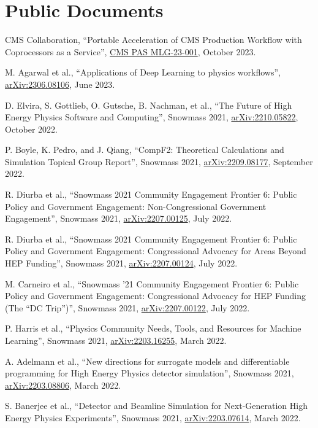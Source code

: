 \section{Public Documents}
\begin{description}[leftmargin=12pt,font=\normalfont,labelsep=0em]
\item CMS Collaboration, ``Portable Acceleration of CMS Production Workflow with Coprocessors as a Service'', \href{http://cds.cern.ch/record/2872973}{CMS PAS MLG-23-001}, October 2023.
\item M. Agarwal et al., ``Applications of Deep Learning to physics workflows'', \href{https://arxiv.org/abs/2306.08106}{arXiv:2306.08106}, June 2023.
\item D. Elvira, S. Gottlieb, O. Gutsche, B. Nachman, et al., ``The Future of High Energy Physics Software and Computing'', Snowmass 2021, \href{https://arxiv.org/abs/2210.05822}{arXiv:2210.05822}, October 2022.
\item P. Boyle, K. Pedro, and J. Qiang, ``CompF2: Theoretical Calculations and Simulation Topical Group Report'', Snowmass 2021, \href{https://arxiv.org/abs/2209.08177}{arXiv:2209.08177}, September 2022.
\item R. Diurba et al., ``Snowmass 2021 Community Engagement Frontier 6: Public Policy and Government Engagement: Non-Congressional Government Engagement'', Snowmass 2021, \href{https://arxiv.org/abs/2207.00125}{arXiv:2207.00125}, July 2022.
\item R. Diurba et al., ``Snowmass 2021 Community Engagement Frontier 6: Public Policy and Government Engagement: Congressional Advocacy for Areas Beyond HEP Funding'', Snowmass 2021, \href{https://arxiv.org/abs/2207.00124}{arXiv:2207.00124}, July 2022.
\item M. Carneiro et al., ``Snowmass '21 Community Engagement Frontier 6: Public Policy and Government Engagement: Congressional Advocacy for HEP Funding (The ``DC Trip'')'', Snowmass 2021, \href{https://arxiv.org/abs/2207.00122}{arXiv:2207.00122}, July 2022.
\item P. Harris et al., ``Physics Community Needs, Tools, and Resources for Machine Learning'', Snowmass 2021, \href{https://arxiv.org/abs/2203.16255}{arXiv:2203.16255}, March 2022.
\item A. Adelmann et al., ``New directions for surrogate models and differentiable programming for High Energy Physics detector simulation'', Snowmass 2021, \href{https://arxiv.org/abs/2203.08806}{arXiv:2203.08806}, March 2022.
\item S. Banerjee et al., ``Detector and Beamline Simulation for Next-Generation High Energy Physics Experiments'', Snowmass 2021, \href{https://arxiv.org/abs/2203.07614}{arXiv:2203.07614}, March 2022.

\end{description}
